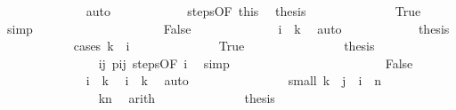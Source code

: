 \begin{isabellebody}
\ \ \ \ \ \ \ \ \ \ \ \ \isamarkupfalse%
\ auto\isanewline
\ \ \ \ \ \ \ \ \ \ \isamarkupfalse%
\ steps{\isacharbrackleft}{\kern0pt}OF\ this{\isacharbrackright}{\kern0pt}\ \isamarkupfalse%
\ {\isacharquery}{\kern0pt}thesis\isanewline
\ \ \ \ \ \ \ \ \ \ \ \ \isamarkupfalse%
\ True\ \isamarkupfalse%
\ simp\isanewline
\ \ \ \ \ \ \ \ \isamarkupfalse%
\isanewline
\ \ \ \ \ \ \ \ \ \ \isamarkupfalse%
\ False\isanewline
\ \ \ \ \ \ \ \ \ \ \isamarkupfalse%
\ \isamarkupfalse%
\ {\isachardoublequoteopen}i\ {\isasymle}\ k{\isachardoublequoteclose}\ \isamarkupfalse%
\ auto\isanewline
\ \ \ \ \ \ \ \ \ \ \isamarkupfalse%
\ {\isacharquery}{\kern0pt}thesis\isanewline
\ \ \ \ \ \ \ \ \ \ \isamarkupfalse%
\ {\isacharparenleft}{\kern0pt}cases\ {\isachardoublequoteopen}k\ {\isacharequal}{\kern0pt}\ i{\isachardoublequoteclose}{\isacharparenright}{\kern0pt}\isanewline
\ \ \ \ \ \ \ \ \ \ \ \ \isamarkupfalse%
\ True\isanewline
\ \ \ \ \ \ \ \ \ \ \ \ \isamarkupfalse%
\ \isamarkupfalse%
\ {\isacharquery}{\kern0pt}thesis\isanewline
\ \ \ \ \ \ \ \ \ \ \ \ \ \ \isamarkupfalse%
\ ij\ pij\ steps{\isacharbrackleft}{\kern0pt}OF\ i{\isacharbrackright}{\kern0pt}\ \isamarkupfalse%
\ simp\isanewline
\ \ \ \ \ \ \ \ \ \ \isamarkupfalse%
\isanewline
\ \ \ \ \ \ \ \ \ \ \ \ \isamarkupfalse%
\ False\isanewline
\ \ \ \ \ \ \ \ \ \ \ \ \isamarkupfalse%
\ {\isacartoucheopen}i\ {\isasymle}\ k{\isacartoucheclose}\ \isamarkupfalse%
\ {\isachardoublequoteopen}i\ {\isacharless}{\kern0pt}\ k{\isachardoublequoteclose}\ \isamarkupfalse%
\ auto\isanewline
\ \ \ \ \ \ \ \ \ \ \ \ \isamarkupfalse%
\ \isamarkupfalse%
\ small{\isacharcolon}{\kern0pt}\ {\isachardoublequoteopen}k\ {\isacharplus}{\kern0pt}\ {\isacharparenleft}{\kern0pt}j\ {\isacharminus}{\kern0pt}\ i{\isacharparenright}{\kern0pt}\ {\isasymle}\ n{\isachardoublequoteclose}\isanewline
\ \ \ \ \ \ \ \ \ \ \ \ \ \ \isamarkupfalse%
\ {\isacartoucheopen}k{\isacharless}{\kern0pt}{\isacharquery}{\kern0pt}n{\isacartoucheclose}\ \isamarkupfalse%
\ arith\isanewline
\ \ \ \ \ \ \ \ \ \ \ \ \isamarkupfalse%
\ {\isacharquery}{\kern0pt}thesis\isanewline
\ \ \ \ \ \ \ \ \ \ \ \ \ \ \isamarkupfalse%

\end{isabellebody}
